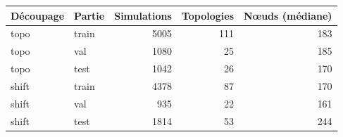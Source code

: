 \begin{tabular}{llrrr}
\toprule
Découpage & Partie & Simulations & Topologies & Nœuds (médiane) \\
\midrule
topo & train & 5005 & 111 & 183 \\
topo & val & 1080 & 25 & 185 \\
topo & test & 1042 & 26 & 170 \\
shift & train & 4378 & 87 & 170 \\
shift & val & 935 & 22 & 161 \\
shift & test & 1814 & 53 & 244 \\
\bottomrule
\end{tabular}
